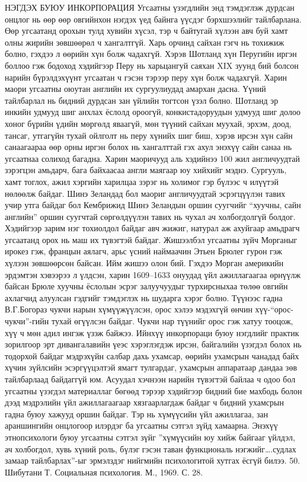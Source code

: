 НЭГДЭХ БУЮУ ИНКОРПОРАЦИЯ
Угсаатны үзэгдлийн энд тэмдэглэж дурдсан онцлог нь өөр өөр овгийнхон нэгдэх үед байнга үүсдэг бэрхшээлийг тайлбарлана. Өөр угсаатанд орохын тулд хувийн хүсэл, тэр ч байтугай хүлээн авч буй хамт олны жирийн зөвшөөрөл ч хангалтгүй. Харь орчинд сайхан гэгч нь тохижиж болно, гэхдээ л өөрийн хүн болж чадахгүй. Хэрэв Шотланд хүн Перугийн иргэн боллоо гэж бодоход хэдийгээр Перу нь харьцангуй саяхан XIX зуунд бий болсон нарийн бүрэлдэхүүнт угсаатан ч гэсэн тэрээр перу хүн болж чадахгүй. Харин маори угсаатны оюутан английн их сургуулиудад амархан дасна. Үүний тайлбарлал нь бидний дурдсан зан үйлийн тогтсон үзэл болно.
Шотланд эр инкийн удмууд шиг анхлах ёслолд ороогүй, конкистадоруудын удмууд шиг долоо хоног бүрийн үдийн мөргөлд яваагүй, мөн түүний сайхан муухай, эрхэм, доод, тансаг, утгагүйн тухай ойлголт нь перу хүнийх шиг биш, хэрэв ирсэн хүн сайн санаагаараа өөр орны иргэн болох нь хангалттай гэх ахул энэхүү сайн санаа нь угсаатнаа солиход багадна. Харин маоричууд аль хэдийнээ 100 жил англичуудтай зэрэгцэн амьдарч, бага байхаасаа англи маягаар юу хийхийг мэднэ. Сургууль, хамт тоглох, ажил хэргийн харилцаа зэрэг нь холимог гэр бүлээс ч илүүтэй нөлөөлж байдаг. Шинэ Зеландад бол маориг англичуудтай эсрэгцүүлэн тавих учир утга байдаг бол Кембрижид Шинэ Зеландын оршин суугчийг “хуучны, сайн английн” оршин суугчтай сөргөлдүүлэн тавих нь чухал ач холбогдолгүй болдог.
Хэдийгээр зарим нэг тохиолдол байдаг авч жижиг, натурал аж ахуйгаар амьдрагч угсаатанд орох нь маш их түвэгтэй байдаг. Жишээлбэл угсаатны зүйч Морганыг ирокез гэж, францын аялагч, арьс үсний наймаачин Этьен Брюлег гурон гэж хүлээн зөвшөөрсөн байсан. Ийм жишээ олон бий. Гэхдээ Морган америкийн эрдэмтэн хэвээрээ л үлдсэн, харин 1609–1633 онуудад үйл ажиллагаагаа өрнүүлж байсан Брюле хуучны ёслолын эсрэг залуучуудыг турхирсныхаа төлөө овгийн ахлагчид алуулсан гэдгийг тэмдэглэх нь шударга хэрэг болно. Түүнээс гадна В.Г.Богораз чукчи нарын хүмүүжүүлсэн, орос хэлээ мэдэхгүй өнчин хүү-“орос-чукчи”-гийн тухай өгүүлсэн байдаг. Чукчи нар түүнийг орос гэж хатуу тооцож, хүү ч мөн адил ингэж үзэж байжээ.
Ийнхүү инкорпораци буюу нэгдлийг практик зорилгоор эрт дивангалавийн үеэс хэрэглэгдэж ирсэн, байгалийн үзэгдэл болох нь тодорхой байдаг мэдрэхүйн салбар дахь ухамсар, өөрийн ухамсрын чанадад байх хүчин зүйлсийн эсэргүүцэлтэй ямагт тулгардаг, ухамсрын аппаратаар дандаа зөв тайлбарлаад байдаггүй юм. Асуудал хэчнээн нарийн түвэгтэй байлаа ч одоо бол угсаатны үзэгдэл материаллаг бөгөөд тэрээр хэдийгээр бидний бие махбодь болон дээд мэдрэлийн үйл ажиллагаагаар хязгаарлагдаж байдаг ч бидний ухамсрын гадна буюу хажууд оршин байдаг. Тэр нь хүмүүсийн үйл ажиллагаа, зан араншингийн онцлогоор илэрдэг ба угсаатны сэтгэл зүйд хамаарна. Энэхүү этнопсихологи буюу угсаатны сэтгэл зүйг ”хүмүүсийн юу хийж байгааг үйлдэл, ач холбогдол, хувь хүний роль, бүлэг гэсэн таван функциональ нэгжийг….судлах замаар тайлбарлах”-ыг эрмэлздэг нийгмийн психологитой хутгах ёсгүй билээ. 50. Шибутани Т. Социальная психология. М., 1969. С. 28.
